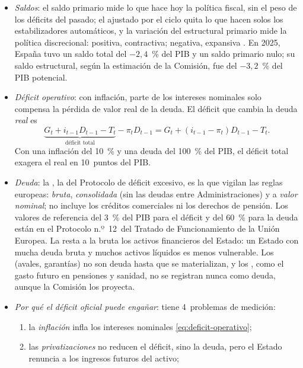 \documentclass[11pt]{article}
\begin{document}
\begin{itemize}
\item \emph{Saldos}: el saldo primario mide lo que hace hoy la política fiscal, sin el peso de los déficits del pasado; el ajustado por el ciclo quita lo que hacen solos los estabilizadores automáticos, y la variación del estructural primario mide la política discrecional: positiva, contractiva; negativa, expansiva . En 2025, España tuvo un saldo total del $-2{,}4$~\% del PIB y un saldo primario nulo\nocite{Eurostat2026EDP}; su saldo estructural, según la estimación de la Comisión, fue del $-3{,}2$~\% del PIB potencial\nocite{CE2026AMECO}.
\item \emph{Déficit operativo}: con inflación, parte de los intereses nominales solo compensa la pérdida de valor real de la deuda. El déficit que cambia la deuda \emph{real} es
  \begin{equation}\label{eq:deficit-operativo}
  \underbrace{G_t+i_{t-1}D_{t-1}-T_t}_{\text{déficit total}}-\pi_tD_{t-1}=G_t+(i_{t-1}-\pi_t)D_{t-1}-T_t .
  \end{equation}
  Con una inflación del 10~\% y una deuda del 100~\% del PIB, el déficit total exagera el real en 10~puntos del PIB\nocite{Blanchard2021Macroeconomics}.
\item \emph{Deuda}: la , la del Protocolo de déficit excesivo, es la que vigilan las reglas europeas: \emph{bruta}, \emph{consolidada} (sin las deudas entre Administraciones) y a \emph{valor nominal}; no incluye los créditos comerciales ni los derechos de pensión\nocite{CE2009Reglamento479}. Los valores de referencia del 3~\% del PIB para el déficit y del 60~\% para la deuda están en el Protocolo n.º~12~del Tratado de Funcionamiento de la Unión Europea\nocite{TFUE2012Protocolo12}. La  resta a la bruta los activos financieros del Estado: un Estado con mucha deuda bruta y muchos activos líquidos es menos vulnerable\nocite{FMI2018FiscalMonitor}. Los  (avales, garantías) no son deuda hasta que se materializan, y los , como el gasto futuro en pensiones y sanidad, no se registran nunca como deuda, aunque la Comisión los proyecta\nocite{CE2024Envejecimiento}.
\item \emph{Por qué el déficit oficial puede engañar}: tiene 4~problemas de medición:
  \begin{enumerate}
  \item la \emph{inflación} infla los intereses nominales \eqref{eq:deficit-operativo};
  \item las \emph{privatizaciones} no reducen el déficit, sino la deuda, pero el Estado renuncia a los ingresos futuros del activo;

\end{enumerate}
\end{itemize}
\end{document}
